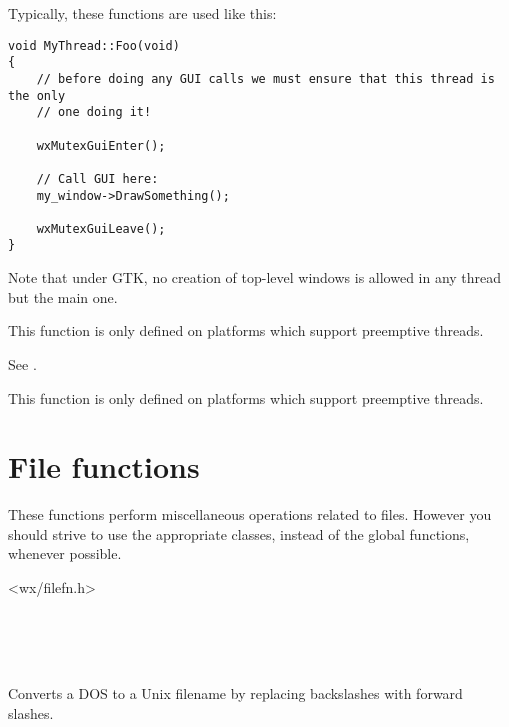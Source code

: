 Typically, these functions are used like this:

\begin{verbatim}
void MyThread::Foo(void)
{
    // before doing any GUI calls we must ensure that this thread is the only
    // one doing it!

    wxMutexGuiEnter();

    // Call GUI here:
    my_window->DrawSomething();

    wxMutexGuiLeave();
}
\end{verbatim}

Note that under GTK, no creation of top-level windows is allowed in any
thread but the main one.

This function is only defined on platforms which support preemptive
threads.


\label{wxmutexguileave}


See .

This function is only defined on platforms which support preemptive
threads.



\section{File functions}\label{filefunctions}

These functions perform miscellaneous operations related to files.
However you should strive to use the appropriate classes, instead of the
global functions, whenever possible.


<wx/filefn.h>


\\
\\
\\


\label{wxdos2unixfilename}


Converts a DOS to a Unix filename by replacing backslashes with forward
slashes.


\label{functionwxfileexists}

